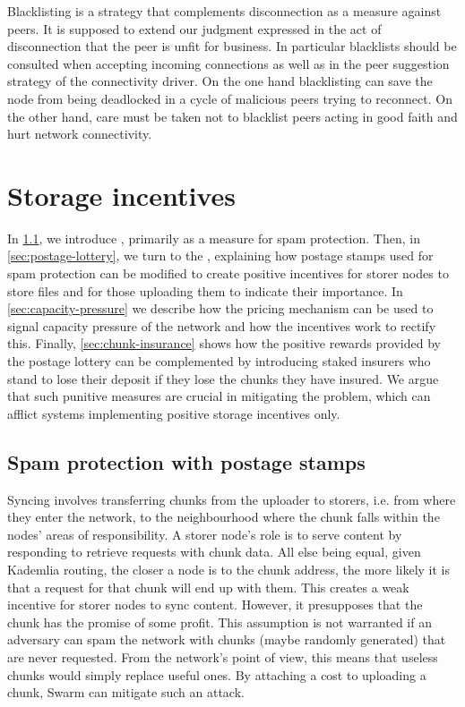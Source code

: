 Blacklisting is a strategy that complements disconnection as a measure against peers. It is supposed to extend our judgment expressed in the act of disconnection that the peer is unfit for business.
In particular blacklists should be consulted when accepting incoming connections as well as in the peer suggestion strategy of the connectivity driver. On the one hand blacklisting can save the node from being deadlocked in a cycle of malicious peers trying to reconnect. On the other hand, care must be taken not to blacklist peers acting in good faith and hurt network connectivity.



\section{Storage incentives \statusyellow}\label{sec:storage-incentives}


In \ref{sec:postage-stamps}, we introduce , primarily as a measure for spam protection.  
Then, in \ref{sec:postage-lottery}, we turn to the , explaining how postage stamps used for spam protection can be modified to create positive incentives for storer nodes to store files and for those uploading them to indicate their importance. In \ref{sec:capacity-pressure} we describe how the pricing mechanism can be used to signal capacity pressure of the network and how the incentives work to rectify this. Finally, \ref{sec:chunk-insurance} shows how the  positive rewards provided by the postage lottery can be complemented by introducing staked insurers who stand to lose their deposit if they lose  the chunks they have insured. We argue that such punitive measures are crucial in mitigating the  problem, which can afflict systems implementing positive storage incentives only. 

\subsection{Spam protection with postage stamps\statusgreen}\label{sec:postage-stamps}
\green{}

Syncing involves transferring chunks from the uploader to storers, i.e. from where they enter the network, to the neighbourhood where the chunk falls within the nodes' areas of responsibility. A storer node's role is to serve content by responding to retrieve requests with chunk data. All else being equal, given Kademlia routing, the closer a node is to the chunk address, the more likely it is that a request for that chunk will end up with them. This creates a weak incentive for storer nodes to sync content. However, it presupposes that the chunk has the promise of some profit. This assumption is not warranted if an adversary can spam the network with chunks (maybe randomly generated) that are never requested. From the network's point of view, this means that useless chunks would simply replace useful ones. By attaching a cost to uploading a chunk, Swarm can mitigate such an attack.


